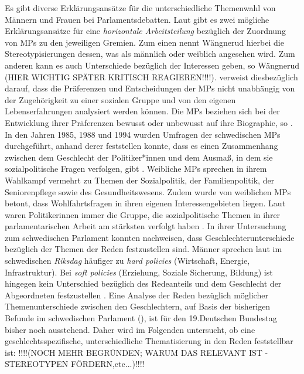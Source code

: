 \documentclass[12pt, 
    twoside=false, 
    bibliography=totoc, 
    numbers=endperiod, 
    headings=normal, 
    toc=chapterentrydotfill
    ]{scrbook}
\begin{document}
Es gibt diverse Erklärungsansätze für die unterschiedliche Themenwahl von Männern und Frauen bei Parlamentsdebatten. Laut \textcite{wangnerud_1996}  gibt es zwei mögliche Erklärungsansätze für eine \emph{horizontale Arbeitsteilung} bezüglich der Zuordnung von MPs zu den jeweiligen Gremien. Zum einen nennt Wängnerud hierbei die Stereotypisierungen dessen, was als männlich oder weiblich angesehen wird. Zum anderen kann es auch Unterschiede bezüglich der Interessen geben, so Wängnerud (HIER WICHTIG SPÄTER KRITISCH REAGIEREN!!!!). \textcite{back_2014} verweist diesbezüglich darauf, dass die Präferenzen und Entscheidungen der MPs nicht unabhängig von der Zugehörigkeit zu einer sozialen Gruppe und von den eigenen Lebenserfahrungen analysiert werden können. Die MPs beziehen sich bei der Entwicklung ihrer Präferenzen bewusst oder unbewusst auf ihre Biographie, so  \textcite[507]{back_2014}. 
In den Jahren 1985, 1988 und 1994 wurden Umfragen der schwedischen MPs durchgeführt, anhand derer \textcite[81]{wangnerud_2000} feststellen konnte, dass es einen Zusammenhang zwischen dem Geschlecht der Politiker*innen und dem Ausmaß, in dem sie sozialpolitische Fragen verfolgen, gibt \parencites[506]{back_2014}[82]{wangnerud_2000}. Weibliche MPs sprechen in ihrem Wahlkampf vermehrt zu Themen der Sozialpolitik, der Familienpolitik, der Seniorenpflege sowie des Gesundheitswesens. Zudem wurde von weiblichen MPs betont, dass Wohlfahrtsfragen in ihren eigenen Interessengebieten liegen. Laut \textcite[82]{wangnerud_2000} waren Politikerinnen immer die Gruppe, die sozialpolitische Themen in ihrer parlamentarischen Arbeit am stärksten verfolgt haben \parencites[Vgl.][507]{back_2014}.
In ihrer Untersuchung zum schwedischen Parlament konnten \textcite{back_2014} nachweisen, dass Geschlechterunterschiede bezüglich der Themen der Reden festzustellen sind. Männer sprechen laut \textcite{back_2014} im schwedischen \emph{Riksdag} häufiger zu \emph{hard policies} (Wirtschaft, Energie, Infrastruktur). Bei \emph{soft policies} (Erziehung, Soziale Sicherung, Bildung) ist hingegen kein Unterschied bezüglich des Redeanteils und dem Geschlecht der Abgeordneten festzustellen \parencite[514f.]{back_2014}.  
Eine Analyse der Reden bezüglich möglicher Themenunterschiede zwischen den Geschlechtern, auf Basis der bisherigen Befunde im schwedischen Parlament (\parencites{wangnerud_2000}{wangnerud_2009}{back_2014}), ist für den 19.Deutschen Bundestag bisher noch ausstehend. Daher wird im Folgenden untersucht, ob eine geschlechtsspezifische, unterschiedliche Thematisierung in den Reden feststellbar ist: !!!!(NOCH MEHR BEGRÜNDEN; WARUM DAS RELEVANT IST - STEREOTYPEN FÖRDERN,etc...)!!!!
\end{document}
